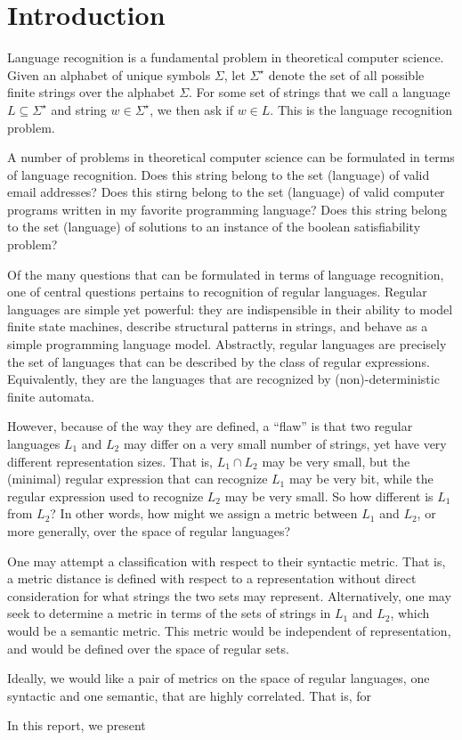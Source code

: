 
\section{Introduction}

Language recognition is a fundamental problem in theoretical computer science.
Given an alphabet of unique symbols \(\Sigma\),
let \(\Sigma^\star\) denote the set of all possible finite strings over
the alphabet \(\Sigma\).
For some set of strings that we call a language \(L \subseteq \Sigma^\star\)
and string \(w \in \Sigma^\star\),
we then ask if \(w \in L\).
This is the language recognition problem.

A number of problems in theoretical computer science can be formulated
in terms of language recognition.
Does this string belong to the set (language) of valid email addresses?
Does this stirng belong to the set (language) of valid
computer programs written in my favorite programming language?
Does this string belong to the set (language) of solutions
to an instance of the boolean satisfiability problem?

Of the many questions that can be formulated in terms of language recognition,
one of central questions pertains to recognition of regular languages.
Regular languages are simple yet powerful:
they are indispensible in their ability to model
finite state machines,
describe structural patterns in strings,
and behave as a simple programming language model.
Abstractly, regular languages are precisely the set of languages that
can be described by the class of regular expressions.
Equivalently, they are the languages that are recognized by
(non)-deterministic finite automata.

However, because of the way they are defined, a ``flaw'' is that
two regular languages \(L_1\) and \(L_2\) may differ on a very small number
of strings, yet have very different representation sizes.
That is, \(L_1 \cap L_2\) may be very small,
but the (minimal) regular expression that can recognize \(L_1\) may be
very bit, while the regular expression used to recognize \(L_2\)
may be very small.
So how different is \(L_1\) from \(L_2\)?
In other words, how might we assign a metric between \(L_1\) and \(L_2\),
or more generally, over the space of regular languages?

One may attempt a classification with respect to their syntactic metric.
That is, a metric distance is defined with respect to a representation
without direct consideration for what strings the two sets may represent.
Alternatively, one may seek to determine a metric in terms of
the sets of strings in \(L_1\) and \(L_2\), which would be a semantic metric.
This metric would be independent of representation,
and would be defined over the space of regular sets.



Ideally, we would like a pair of metrics on the space of regular languages,
one syntactic and one semantic,
that are highly correlated.
That is, for 



In this report,
we present








